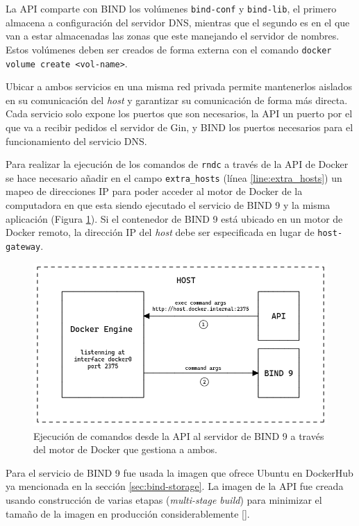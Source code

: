 La API comparte con BIND los volúmenes \verb|bind-conf| y \verb|bind-lib|, el primero almacena a configuración del servidor DNS, mientras que el segundo es en el que van a estar almacenadas las zonas que este manejando el servidor de nombres. Estos volúmenes deben ser creados de forma externa con el comando \verb|docker volume create <vol-name>|.

Ubicar a ambos servicios en una misma red privada permite mantenerlos aislados en su comunicación del \textit{host} y garantizar su comunicación de forma más directa. Cada servicio solo expone los puertos que son necesarios, la API un puerto por el que va a recibir pedidos el servidor de Gin, y BIND los puertos necesarios para el funcionamiento del servicio DNS.

Para realizar la ejecución de los comandos de \verb|rndc| a través de la API de Docker se hace necesario añadir en el campo \verb|extra_hosts| (línea \ref{line:extra_hosts}) un mapeo de direcciones IP para poder acceder al motor de Docker de la computadora en que esta siendo ejecutado el servicio de BIND 9 y la misma aplicación (Figura \ref{fig:extra_hosts}). Si el contenedor de BIND 9 está ubicado en  un motor de Docker remoto, la dirección IP del \textit{host} debe ser especificada en lugar de \verb|host-gateway|.

\begin{figure}[!ht]
    \centering
    \includegraphics[width=\linewidth]{draws/extra_hosts.png}
    \caption{Ejecución de comandos desde la API al servidor de BIND 9 a través del motor de Docker que gestiona a ambos.}
    \label{fig:extra_hosts}
\end{figure}

Para el servicio de BIND 9 fue usada la imagen que ofrece Ubuntu en DockerHub ya mencionada en la sección \ref{sec:bind-storage}. La imagen de la API fue creada usando construcción de varias etapas (\textit{multi-stage build}) para minimizar el tamaño de la imagen en producción considerablemente [\cite{multi-stage}].

